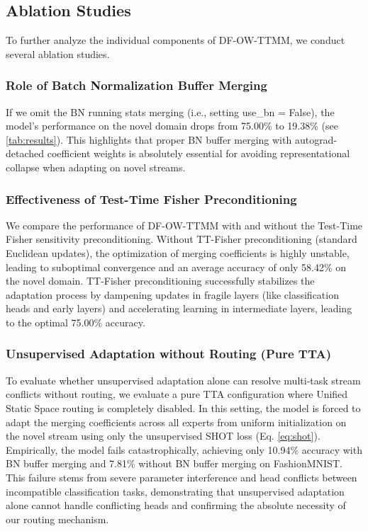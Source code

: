 \documentclass{article}
\theoremstyle{plain}
\theoremstyle{definition}
\theoremstyle{remark}
\begin{document}
\subsection{Ablation Studies}
To further analyze the individual components of DF-OW-TTMM, we conduct several ablation studies.

\subsubsection{Role of Batch Normalization Buffer Merging}
If we omit the BN running stats merging (i.e., setting use\_bn = False), the model's performance on the novel domain drops from 75.00\% to 19.38\% (see \cref{tab:results}). This highlights that proper BN buffer merging with autograd-detached coefficient weights is absolutely essential for avoiding representational collapse when adapting on novel streams.

\subsubsection{Effectiveness of Test-Time Fisher Preconditioning}
We compare the performance of DF-OW-TTMM with and without the Test-Time Fisher sensitivity preconditioning. Without TT-Fisher preconditioning (standard Euclidean updates), the optimization of merging coefficients is highly unstable, leading to suboptimal convergence and an average accuracy of only 58.42\% on the novel domain. TT-Fisher preconditioning successfully stabilizes the adaptation process by dampening updates in fragile layers (like classification heads and early layers) and accelerating learning in intermediate layers, leading to the optimal 75.00\% accuracy.

\subsubsection{Unsupervised Adaptation without Routing (Pure TTA)}
To evaluate whether unsupervised adaptation alone can resolve multi-task stream conflicts without routing, we evaluate a pure TTA configuration where Unified Static Space routing is completely disabled. In this setting, the model is forced to adapt the merging coefficients across all experts from uniform initialization on the novel stream using only the unsupervised SHOT loss (Eq. \ref{eq:shot}). Empirically, the model fails catastrophically, achieving only 10.94\% accuracy with BN buffer merging and 7.81\% without BN buffer merging on FashionMNIST. This failure stems from severe parameter interference and head conflicts between incompatible classification tasks, demonstrating that unsupervised adaptation alone cannot handle conflicting heads and confirming the absolute necessity of our routing mechanism.
\end{document}
